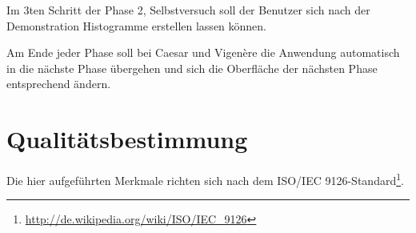 \documentclass{article}
\begin{document}
\begin{T}[start = 110]
 \item Im 3ten Schritt der Phase 2, Selbstversuch soll der Benutzer sich nach der Demonstration Histogramme erstellen lassen können.
\end{T}

\begin{T}[start = 120]
 \item Am Ende jeder Phase soll bei Caesar und Vigenère die Anwendung automatisch in die nächste Phase übergehen und sich die Oberfläche 
       der nächsten Phase entsprechend ändern.
\end{T}

\section{Qualitätsbestimmung}

Die hier aufgeführten Merkmale richten sich nach dem ISO/IEC 9126-Standard\footnote{\url{http://de.wikipedia.org/wiki/ISO/IEC_9126}}.
\end{document}
